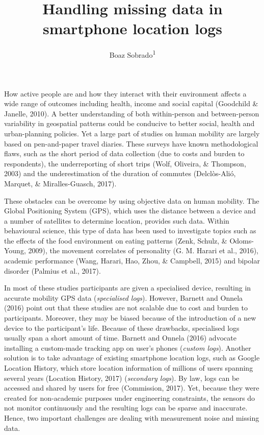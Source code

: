 \documentclass[english,man]{apa6}
\title{Handling missing data in smartphone location logs}
\author{Boaz Sobrado\textsuperscript{1}}
\affiliation{
    \vspace{0.5cm}
          \textsuperscript{1} Utrecht University  }
\theoremstyle{definition}
\theoremstyle{definition}
\theoremstyle{definition}
\theoremstyle{remark}
\begin{document}
\maketitle

\setcounter{secnumdepth}{0}



How active people are and how they interact with their environment
affects a wide range of outcomes including health, income and social
capital (Goodchild \& Janelle, 2010). A better understanding of both
within-person and between-person variability in geospatial patterns
could be conducive to better social, health and urban-planning policies.
Yet a large part of studies on human mobility are largely based on
pen-and-paper travel diaries. These surveys have known methodological
flaws, such as the short period of data collection (due to costs and
burden to respondents), the underreporting of short trips (Wolf,
Oliveira, \& Thompson, 2003) and the underestimation of the duration of
commutes (Delclòs-Alió, Marquet, \& Miralles-Guasch, 2017).

These obstacles can be overcome by using objective data on human
mobility. The Global Positioning System (GPS), which uses the distance
between a device and a number of satellites to determine location,
provides such data. Within behavioural science, this type of data has
been used to investigate topics such as the effects of the food
environment on eating patterns (Zenk, Schulz, \& Odoms-Young, 2009), the
movement correlates of personality (G. M. Harari et al., 2016), academic
performance (Wang, Harari, Hao, Zhou, \& Campbell, 2015) and bipolar
disorder (Palmius et al., 2017).

In most of these studies participants are given a specialised device,
resulting in accurate mobility GPS data (\emph{specialised logs}).
However, Barnett and Onnela (2016) point out that these studies are not
scalable due to cost and burden to participants. Moreover, they may be
biased because of the introduction of a new device to the participant's
life. Because of these drawbacks, specialised logs usually span a short
amount of time. Barnett and Onnela (2016) advocate installing a
custom-made tracking app on user's phones (\emph{custom logs}). Another
solution is to take advantage of existing smartphone location logs, such
as Google Location History, which store location information of millions
of users spanning several years (Location History, 2017)
(\emph{secondary logs}). By law, logs can be accessed and shared by
users for free (Commission, 2017). Yet, because they were created for
non-academic purposes under engineering constraints, the sensors do not
monitor continuously and the resulting logs can be sparse and
inaccurate. Hence, two important challenges are dealing with measurement
noise and missing data.
\end{document}
